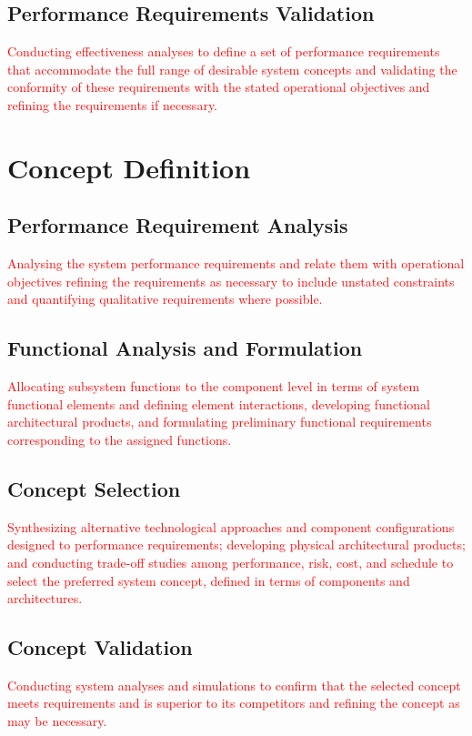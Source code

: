 \documentclass[a4paper,11pt,fleqn]{report}
\begin{document}
\subsection{Performance Requirements Validation}
\textcolor{red}{Conducting effectiveness analyses to define a set of performance requirements that accommodate the full range of desirable system concepts and validating the conformity of these requirements with the stated operational objectives and refining the requirements if necessary.}

\section{Concept Definition}
\subsection{Performance Requirement Analysis}
\textcolor{red}{Analysing the system performance requirements and relate them with operational objectives refining the requirements as necessary to include unstated constraints and quantifying qualitative requirements where possible.}

\subsection{Functional Analysis and Formulation} 
\textcolor{red}{Allocating subsystem functions to the component level in terms of system functional elements and defining element interactions, developing functional architectural products, and formulating preliminary functional requirements corresponding to the assigned functions.}

\subsection{Concept Selection}
\textcolor{red}{Synthesizing alternative technological approaches and component configurations designed to performance requirements; developing physical architectural products; and conducting trade-off studies among performance, risk, cost, and schedule to select the preferred system concept, defined in terms of components and architectures.}

\subsection{Concept Validation}
\textcolor{red}{Conducting system analyses and simulations to confirm that the selected concept meets requirements and is superior to its competitors and refining the concept as may be necessary.}
\end{document}
